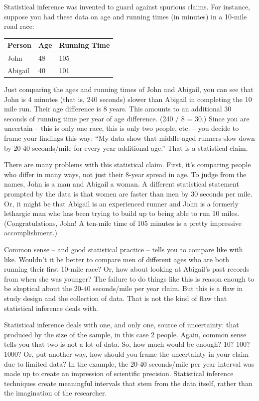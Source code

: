 \documentclass[]{tufte-book}
\begin{document}
Statistical inference was invented to guard against spurious claims. For instance, suppose you had these data on age and running times (in minutes) in a 10-mile road race:

\begin{longtable}[]{@{}lll@{}}
\toprule
Person & Age & Running Time\tabularnewline
\midrule
\endhead
John & 48 & 105\tabularnewline
Abigail & 40 & 101\tabularnewline
\bottomrule
\end{longtable}

Just comparing the ages and running times of John and Abigail, you can see that John is 4 minutes (that is, 240 seconds) slower than Abigail in completing the 10 mile run. Their age difference is 8 years. This amounts to an additional 30 seconds of running time per year of age difference. (240 / 8 = 30.) Since you are uncertain -- this is only one race, this is only two people, etc. -- you decide to frame your findings this way: ``My data show that middle-aged runners slow down by 20-40 seconds/mile for every year additional age.'' That is a statistical claim.

There are many problems with this statistical claim. First, it's comparing people who differ in many ways, not just their 8-year spread in age. To judge from the names, John is a man and Abigail a woman. A different statistical statement prompted by the data is that women are faster than men by 30 seconds per mile. Or, it might be that Abigail is an experienced runner and John is a formerly lethargic man who has been trying to build up to being able to run 10 miles. (Congratulations, John! A ten-mile time of 105 minutes is a pretty impressive accomplishment.)

Common sense -- and good statistical practice -- tells you to compare like with like. Wouldn't it be better to compare men of different ages who are both running their first 10-mile race? Or, how about looking at Abigail's past records from when she was younger? The failure to do things like this is reason enough to be skeptical about the 20-40 seconds/mile per year claim. But this is a flaw in study design and the collection of data. That is not the kind of flaw that statistical inference deals with.

Statistical inference deals with one, and only one, source of uncertainty: that produced by the size of the sample, in this case 2 people. Again, common sense tells you that two is not a lot of data. So, how much would be enough? 10? 100? 1000? Or, put another way, how should you frame the uncertainty in your claim due to limited data? In the example, the 20-40 seconds/mile per year interval was made up to create an impression of scientific precision. Statistical inference techniques create meaningful intervals that stem from the data itself, rather than the imagination of the researcher.
\end{document}
